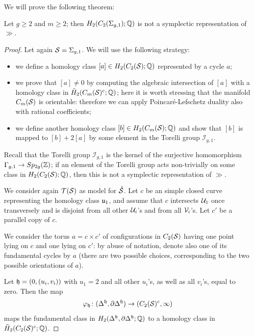 We will prove the following theorem:
\begin{thm}
 \label{thm:counterexample}
 Let $g\geq 2$ and $m\geq 2$; then $H_2(C_2(\Sigma_{g,1});\Q)$ is not a symplectic
 representation of $\gg$.
\end{thm}
\begin{proof}
 Let again $\S=\Sigma_{g,1}$. We will use the following strategy:
 \begin{itemize}
  \item we define a homology class $[a]\in H_2(C_2(\S);\Q)$ represented by a cycle $a$;
  \item we prove that $[a]\neq 0$ by computing the algebraic intersection of
  $[a]$ with a homology class
  in $\tH_2(\cms^c;\Q)$; here it is worth stressing that the manifold
  $\cms$ is orientable: therefore we can apply Poincaré-Lefschetz duality
  also with rational coefficients;
  \item we define another homology class $[b]\in H_2(\cms;\Q)$ and show that
  $[b]$ is mapped to $[b]+2[a]$ by some element in the Torelli group $\mathcal{I}_{g,1}$.
 \end{itemize}
Recall that the Torelli group $\mathcal{I}_{g,1}$ is the kernel of the surjective homomorphism
$\gg\to Sp_{2g}(\Z)$; if an element of the Torelli group acts non-trivially on
some class in $H_2(C_2(\S);\Q)$, then this is not a symplectic representation of $\gg$.

We consider again $\T(\S)$ as model for $\mrS$. Let $c$ be an simple closed curve
representing the homology class $\u_1$, and assume that $c$ intersects $\U_1$ once
transversely and is disjoint from all other $\U_i$'s and from all $\V_i$'s. Let $c'$
be a parallel copy of $c$.

We consider the torus $a=c\times c'$ of configurations in $C_2(\S)$ having one point lying on $c$ and
one lying on $c'$: by abuse of notation, denote also one of its fundamental cycles by $a$
(there are two possible choices, corresponding to the two possible orientations of $a$).

Let $\tup=(0,(u_i,v_i))$ with $u_1=2$ and all other $u_i$'s, as well as all $v_i$'s, equal to zero.
Then the map
\[
\phi_{\tup}\colon (\Delta^{\tup},\partial\Delta^{\tup})\to (C_2(\S)^c,\infty)
\]
maps the fundamental class in $H_2(\Delta^{\tup},\partial\Delta^{\tup};\Q)$ to a homology
class in $\tH_2(C_2(\S)^c;\Q)$.


\end{proof}
